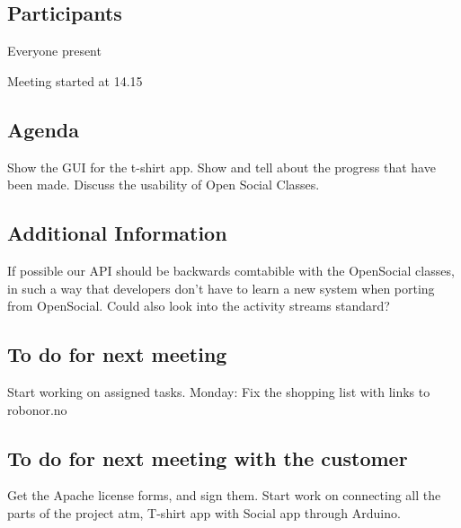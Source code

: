 \subsection{Participants}
Everyone present

Meeting started at 14.15

\subsection{Agenda}
Show the GUI for the t-shirt app.
Show and tell about the progress that have been made.
Discuss the usability of Open Social Classes.

\subsection{Additional Information}
If possible our API should be backwards comtabible with the OpenSocial classes, in such a way that developers don’t have to learn a new system when porting from OpenSocial.
Could also look into the activity streams standard?

\subsection{To do for next meeting}
Start working on assigned tasks.
Monday: Fix the shopping list with links to robonor.no

\subsection{To do for next meeting with the customer}
Get the Apache license forms, and sign them.
Start work on connecting all the parts of the project atm, T-shirt app with Social app through Arduino.